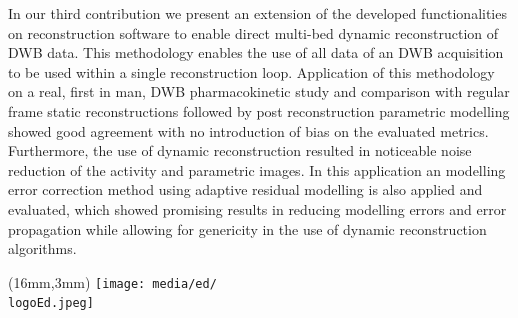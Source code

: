 {In our third contribution we present an extension of the developed functionalities on reconstruction software to enable direct multi-bed dynamic reconstruction of DWB data. This methodology enables the use of all data of an DWB acquisition to be used within a single reconstruction loop. Application of this methodology on a real, first in man, DWB pharmacokinetic study and comparison with regular frame static reconstructions followed by post reconstruction parametric modelling showed good agreement with no introduction of bias on the evaluated metrics. Furthermore, the use of dynamic reconstruction resulted in noticeable noise reduction of the activity and parametric images. 
In this application an modelling error correction method using adaptive residual modelling is also applied and evaluated, which showed promising results in reducing modelling errors and error propagation while allowing for genericity in the use of dynamic reconstruction algorithms.}															%

\label{layout_last}

\pagestyle{empty}

\begin{textblock*}{61mm}(16mm,3mm)
	\noindent\texttt{[image: media/ed/\\logoEd.jpeg]}
\end{textblock*}




